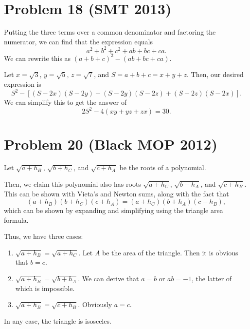 \documentclass{scrartcl}
\begin{document}
\section*{Problem 18 (SMT 2013)}
Putting the three terms over a common denominator and factoring the numerator, we can find that the expression equals
\[
    a^2 + b^2 + c^2 + ab + bc + ca.
\]
We can rewrite this as $(a + b + c)^2 - (ab + bc + ca)$.

Let $x = \sqrt{3}$, $y = \sqrt{5}$, $z = \sqrt{7}$, and $S = a + b + c = x + y + z$. Then, our desired expression is
\[
    S^2 - [(S - 2x)(S - 2y) + (S - 2y)(S - 2z) + (S - 2z)(S - 2x)].
\]
We can simplify this to get the answer of
\[
    2S^2 - 4(xy + yz + zx) = 30.
\]
\section*{Problem 20 (Black MOP 2012)}
Let $\sqrt{a + h_B}$, $\sqrt{b + h_C}$, and $\sqrt{c + h_A}$ be the roots of a polynomial.

Then, we claim this polynomial also has roots $\sqrt{a + h_C}$, $\sqrt{b + h_A}$, and $\sqrt{c + h_B}$. This can be shown with Vieta's and Newton sums, along with the fact that
\[
    (a + h_B)(b + h_C)(c + h_A) = (a + h_C)(b + h_A)(c + h_B),
\]
which can be shown by expanding and simplifying using the triangle area formula.

Thus, we have three cases:
\begin{enumerate}
    \item $\sqrt{a + h_B} = \sqrt{a + h_C}$. Let $A$ be the area of the triangle. Then it is obvious that $b = c$.
    \item $\sqrt{a + h_B} = \sqrt{b + h_A}$. We can derive that $a = b$ or $ab = -1$, the latter of which is impossible.
    \item $\sqrt{a + h_B} = \sqrt{c + h_B}$. Obviously $a = c$.
\end{enumerate}
In any case, the triangle is isosceles.
\end{document}
